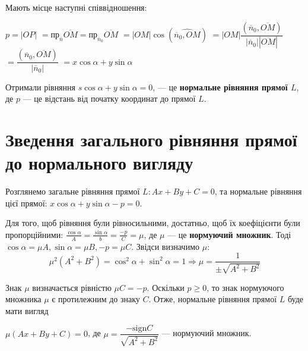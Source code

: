 \parbox{110px}{}
\parbox{8.2cm}{
	Мають місце наступні співвідношення:

	$p = |OP|$
	$= \text{пр}_{\overline{n}}\overline{OM} = \text{пр}_{\overline{n}_0}\overline{OM}$
	$= |OM|\cos(\widehat{\overline{n}_0,OM})$
	$= |OM|\dfrac{(\overline{n}_0,\overline{OM})}{|\overline{n}_0||\overline{OM}|}$
	$= \dfrac{(\overline{n}_0,\overline{OM})}{|\overline{n}_0|}$
	$= x\cos\alpha + y\sin\alpha$
	
	Отримали рівняння
	$s\cos\alpha + y\sin\alpha = 0$,	
	--- це \textbf{нормальне рівняння прямої $L$}, де $p$ --- це відстань від початку
	координат до прямої $L$.
}

\section{Зведення загального рівняння прямої до нормального вигляду}

Розглянемо загальне рівняння прямої $L: Ax + By + C= 0$, та нормальне
рівняння цієї прямої: $x\cos\alpha + y\sin\alpha - p = 0$.

Для того, щоб рівняння були рівносильними, достатньо, щоб їх коефіцієнти
були пропорційними: $\frac{\cos\alpha}{A} = \frac{\sin\alpha}{b} = \frac{-p}{C} = \mu$, де $\mu$ --- це
\textbf{нормуючий множник}. Тоді $\cos\alpha = \mu A, \sin\alpha = \mu B, -p = \mu C$. Звідси визначимо $\mu$:
$$\mu^2(A^2 + B^2) = \cos^2\alpha + \sin^2\alpha = 1 \Rightarrow \mu = \dfrac{1}{\pm\sqrt{A^2 + B^2}}$$

Знак $\mu$ визначається рівністю $\mu C = -p$. Оскільки $p \geq 0$, то знак нормуючого
множника $\mu$ є протилежним до знаку $C$. Отже, нормальне рівняння прямої $L$ буде
мати вигляд

$\mu(Ax+By+C) = 0$, де $\mu = \dfrac{-\text{sign} C}{\sqrt{A^2 + B^2}}$ --- нормуючий множник.

